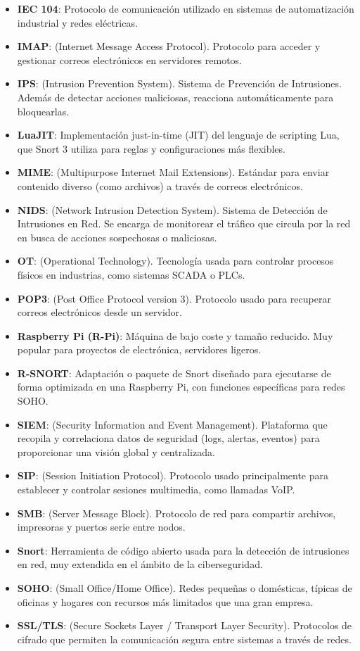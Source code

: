 \documentclass[11pt,a4paper,twoside]{report}
\begin{document}
\begin{itemize}
	\item \textbf{IEC 104}: Protocolo de comunicación utilizado en sistemas de automatización industrial y redes eléctricas.
	\item \textbf{IMAP}: (Internet Message Access Protocol). Protocolo para acceder y gestionar correos electrónicos en servidores remotos.
	\item \textbf{IPS}: (Intrusion Prevention System). Sistema de Prevención de Intrusiones. Además de detectar acciones maliciosas, reacciona automáticamente para bloquearlas.
	\item \textbf{LuaJIT}: Implementación just-in-time (JIT) del lenguaje de scripting Lua, que Snort 3 utiliza para reglas y configuraciones más flexibles.
	\item \textbf{MIME}: (Multipurpose Internet Mail Extensions). Estándar para enviar contenido diverso (como archivos) a través de correos electrónicos.
	\item \textbf{NIDS}: (Network Intrusion Detection System). Sistema de Detección de Intrusiones en Red. Se encarga de monitorear el tráfico que circula por la red en busca de acciones sospechosas o maliciosas.
	\item \textbf{OT}: (Operational Technology). Tecnología usada para controlar procesos físicos en industrias, como sistemas SCADA o PLCs.
	\item \textbf{POP3}: (Post Office Protocol version 3). Protocolo usado para recuperar correos electrónicos desde un servidor.
	\item \textbf{Raspberry Pi (R-Pi)}: Máquina de bajo coste y tamaño reducido. Muy popular para proyectos de electrónica, servidores ligeros.
	\item \textbf{R-SNORT}: Adaptación o paquete de Snort diseñado para ejecutarse de forma optimizada en una Raspberry Pi, con funciones específicas para redes SOHO.
	\item \textbf{SIEM}: (Security Information and Event Management). Plataforma que recopila y correlaciona datos de seguridad (logs, alertas, eventos) para proporcionar una visión global y centralizada.
	\item \textbf{SIP}: (Session Initiation Protocol). Protocolo usado principalmente para establecer y controlar sesiones multimedia, como llamadas VoIP.
	\item \textbf{SMB}: (Server Message Block). Protocolo de red para compartir archivos, impresoras y puertos serie entre nodos.
	\item \textbf{Snort}: Herramienta de código abierto usada para la detección de intrusiones en red, muy extendida en el ámbito de la ciberseguridad.
	\item \textbf{SOHO}: (Small Office/Home Office). Redes pequeñas o domésticas, típicas de oficinas y hogares con recursos más limitados que una gran empresa.
	\item \textbf{SSL/TLS}: (Secure Sockets Layer / Transport Layer Security). Protocolos de cifrado que permiten la comunicación segura entre sistemas a través de redes.
\end{itemize}
\end{document}
